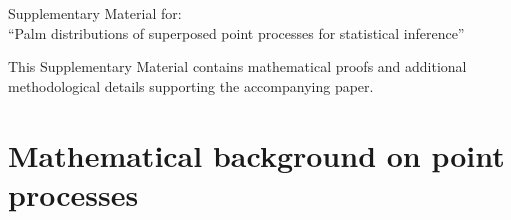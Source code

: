 \documentclass[11pt,a4paper,oneside]{article}
\theoremstyle{definition}
\theoremstyle{remark}
\begin{document}



\clearpage

\setcounter{equation}{0}
\renewcommand\theequation{S\arabic{equation}}
\renewcommand\theHequation{S\arabic{equation}}

\setcounter{theorem}{0}
\renewcommand\thetheorem{S\arabic{theorem}}
\renewcommand\theHtheorem{S\arabic{theorem}}

\setcounter{corollary}{0}
\renewcommand\thecorollary{S\arabic{corollary}}
\renewcommand\theHcorollary{S\arabic{corollary}}

\setcounter{proposition}{0}
\renewcommand\theproposition{S\arabic{proposition}}
\renewcommand\theHproposition{S\arabic{proposition}}

\setcounter{lemma}{0}
\renewcommand\thelemma{S\arabic{lemma}}
\renewcommand\theHlemma{S\arabic{lemma}}

\setcounter{figure}{0}
\renewcommand\thefigure{S\arabic{figure}}
\renewcommand\theHfigure{S\arabic{figure}}

\setcounter{table}{0}
\renewcommand\thetable{S\arabic{table}}
\renewcommand\theHtable{S\arabic{table}}

\setcounter{section}{0}
\renewcommand{\thesection}{S\arabic{section}}
\renewcommand{\theHsection}{S\arabic{section}}

 
\begin{center}
   \LARGE Supplementary Material for:\\
    ``Palm distributions of superposed point processes for statistical inference''
\end{center}


This Supplementary Material contains mathematical proofs and additional methodological details supporting the accompanying paper.

\section{Mathematical background on point processes} \label{app:point_process_definition}
\end{document}
